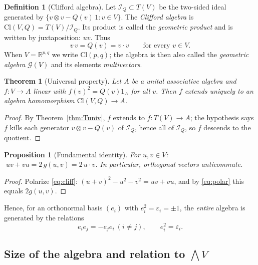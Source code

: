 \documentclass[11pt,a4paper]{article}
\newcounter{thm}[section]
\numberwithin{equation}{section}
\theoremstyle{definition}
\newtheorem{definition}[thm]{Definition}
\theoremstyle{plain}
\newtheorem{theorem}[thm]{Theorem}
\newtheorem{proposition}[thm]{Proposition}
\newcommand{\R}{\mathbb{R}}
\newcommand{\Cl}{\mathrm{Cl}}
\newcommand{\GA}{\mathcal{G}}
\begin{document}
\begin{definition}[Clifford algebra]
Let $\mathcal I_Q\subset T(V)$ be the two-sided ideal generated by $\{v\otimes v-Q(v)\,1: v\in V\}$. The
\emph{Clifford algebra} is $\Cl(V,Q)=T(V)/\mathcal I_Q$. Its product is called the
\emph{geometric product} and is written by juxtaposition: $uv$. Thus
\begin{equation}\label{eq:cliff}
 v\,v=Q(v)=v\cdot v\qquad\text{for every }v\in V.
\end{equation}
When $V=\R^{p,q}$ we write $\Cl(p,q)$; the algebra is then also called the \emph{geometric algebra} $\GA(V)$ and its elements \emph{multivectors}.
\end{definition}

\begin{theorem}[Universal property]\label{thm:cliffuniv}
Let $A$ be a unital associative algebra and $f:V\to A$ linear with $f(v)^2=Q(v)1_A$ for all $v$. Then $f$ extends uniquely to an algebra homomorphism $\Cl(V,Q)\to A$.
\end{theorem}
\begin{proof}
By Theorem~\ref{thm:Tuniv}, $f$ extends to $\bar f:T(V)\to A$; the hypothesis says $\bar f$ kills each generator $v\otimes v-Q(v)$ of $\mathcal I_Q$, hence all of $\mathcal I_Q$, so $\bar f$ descends to the quotient.
\end{proof}

\begin{proposition}[Fundamental identity]\label{prop:fund}
For $u,v\in V$: $\;uv+vu=2\,g(u,v)=2\,u\cdot v$. In particular, orthogonal vectors anticommute.
\end{proposition}
\begin{proof}
Polarize \eqref{eq:cliff}: $(u+v)^2-u^2-v^2=uv+vu$, and by \eqref{eq:polar} this equals $2g(u,v)$.
\end{proof}

Hence, for an orthonormal basis $(e_i)$ with $e_i^2=\varepsilon_i=\pm1$, the \emph{entire} algebra is generated by the relations
\[
 e_ie_j=-e_je_i\ (i\neq j),\qquad e_i^2=\varepsilon_i .
\]

\subsection{Size of the algebra and relation to $\bigwedge V$}
\end{document}
